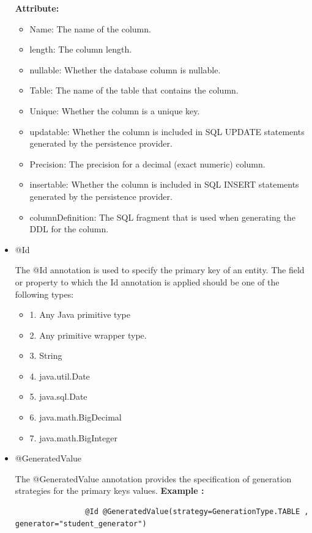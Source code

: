 \documentclass{report}
\begin{document}
\begin{itemize}
			{\large \textbf{ Attribute:}}
			\begin{itemize}
				\item Name: The name of the column.
				\item length: The column length.
				\item nullable: Whether the database column is nullable.
				\item Table: The name of the table that contains the column.
				\item Unique: Whether the column is a unique key.
				\item updatable: Whether the column is included in SQL UPDATE statements generated by the persistence provider.
				\item Precision: The precision for a decimal (exact numeric) column.
				\item insertable: Whether the column is included in SQL INSERT statements generated by the persistence provider.
				\item columnDefinition: The SQL fragment that is used when generating the DDL for the column.
			\end{itemize}
		\item @Id
		\par The @Id annotation is used to specify the primary key of an entity. The field or property to which the Id annotation is applied should be one of the following types:
		\begin{itemize}
			\item 1. Any Java primitive type
			\item 2. Any primitive wrapper type.
			\item 3. String
			\item 4. java.util.Date
			\item 5. java.sql.Date
			\item 6. java.math.BigDecimal
			\item 7. java.math.BigInteger
		\end{itemize}
				\item @GeneratedValue
				\par The @GeneratedValue annotation provides the specification of generation strategies for the primary keys values.
				\newline
				\textbf{Example :}
				\begin{lstlisting}
				@Id @GeneratedValue(strategy=GenerationType.TABLE , generator="student_generator")
				\end{lstlisting}
				\begin{itemize}

\end{itemize}
\end{itemize}
\end{document}
